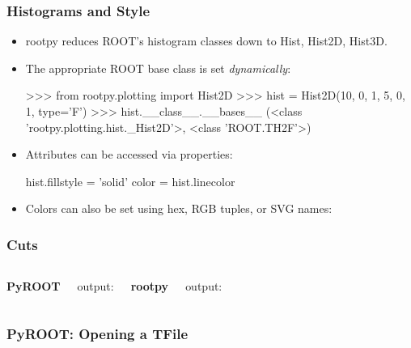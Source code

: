 \documentclass[10pt,professionalfonts,serif,usenames,dvipsnames,svgnames,table]{beamer}
\begin{document}
\begin{frame}[fragile]
    \frametitle{Histograms and Style}
    \begin{itemize}
        \item rootpy reduces ROOT's histogram classes down to Hist, Hist2D,
            Hist3D.
        \item The appropriate ROOT base class is set {\em dynamically}:
            \begin{footnotesize}
\begin{pyglist}[language=python,texcl=true,style=vs]
>>> from rootpy.plotting import Hist2D
>>> hist = Hist2D(10, 0, 1, 5, 0, 1, type='F')
>>> hist.__class__.__bases__
(<class 'rootpy.plotting.hist._Hist2D'>, <class 'ROOT.TH2F'>)
\end{pyglist}
\end{footnotesize}
\item Attributes can be accessed via properties:
\begin{pyglist}[language=python,texcl=true,style=vs]
      hist.fillstyle = 'solid'
      color = hist.linecolor
\end{pyglist}
\item Colors can also be set using hex, RGB tuples, or SVG names:
\end{itemize}
\end{frame}

\begin{frame}[fragile]
    \frametitle{Cuts}
    \begin{columns}
        {\bf PyROOT}
        
        \vspace{-.3cm}
        output:
        \vspace{-.3cm}
        
        {\bf rootpy}
        
        \vspace{-.3cm}
        output:
        \vspace{-.3cm}
        
    \end{columns}
\end{frame}

\begin{frame}[fragile]
    \frametitle{PyROOT: Opening a TFile}

    
    \vspace{-.5cm}
    
\end{frame}
\end{document}
